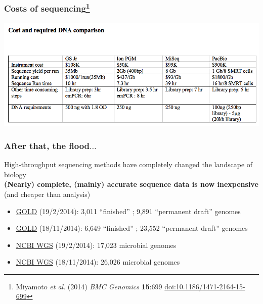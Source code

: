 \begin{frame}
  \frametitle{Costs of sequencing\footnote{\tiny{Miyamoto \textit{et al}. (2014) \textit{BMC Genomics} \textbf{15}:699 \href{http://dx.doi.org/10.1186/1471-2164-15-699}{doi:10.1186/1471-2164-15-699}}}}
    \begin{center}
      \includegraphics[width=1\textwidth]{images/miyamoto_costs}
    \end{center}      
\end{frame}

\begin{frame}
  \frametitle{After that, the flood$\ldots$}
  High-throughput sequencing methods have completely changed the landscape of biology \\
  \textbf{(Nearly) complete, (mainly) accurate sequence data is now inexpensive} (and cheaper than analysis)
  \begin{itemize}
    \item \textcolor{hutton_green}{\href{http://www.genomesonline.org/cgi-bin/GOLD/index.cgi?page_requested=Complete+Genome+Projects&subset_requested=Complete+And+Published}{GOLD} (19/2/2014): 3,011 ``finished'' ; 9,891 ``permanent draft'' genomes}
    \item \textcolor{hutton_blue}{\href{http://www.genomesonline.org/cgi-bin/GOLD/index.cgi?page_requested=Complete+Genome+Projects&subset_requested=Complete+And+Published}{GOLD} (18/11/2014): 6,649 ``finished'' ; 23,552 ``permanent draft'' genomes}
    \item \textcolor{RawSienna}{\href{http://www.ncbi.nlm.nih.gov/Traces/wgs/}{NCBI WGS} (19/2/2014): 17,023 microbial genomes}
    \item \textcolor{hutton_purple}{\href{http://www.ncbi.nlm.nih.gov/Traces/wgs/}{NCBI WGS} (18/11/2014): 26,026 microbial genomes}
  \end{itemize}
\end{frame}

